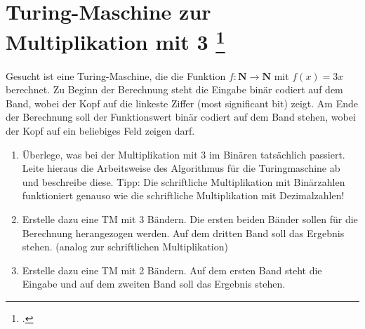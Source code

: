 \documentclass{lehramt-informatik-aufgabe}
\begin{document}
\section{Turing-Maschine zur Multiplikation mit 3
\footcite[Aufgabe 5]{theo:ab:3}}

Gesucht ist eine Turing-Maschine, die die Funktion $f : \mathbf{N}
\rightarrow \mathbf{N}$ mit $f(x) = 3x$ berechnet. Zu Beginn der
Berechnung steht die Eingabe binär codiert auf dem Band, wobei der Kopf
auf die linkeste Ziffer (most significant bit) zeigt. Am Ende der
Berechnung soll der Funktionswert binär codiert auf dem Band stehen,
wobei der Kopf auf ein beliebiges Feld zeigen darf.

\begin{enumerate}


\item Überlege, was bei der Multiplikation mit 3 im Binären tatsächlich
passiert. Leite hieraus die Arbeitsweise des Algorithmus für die
Turingmaschine ab und beschreibe diese. Tipp: Die schriftliche
Multiplikation mit Binärzahlen funktioniert genauso wie die schriftliche
Multiplikation mit Dezimalzahlen!


\item Erstelle dazu eine TM mit 3 Bändern. Die ersten beiden Bänder
sollen für die Berechnung herangezogen werden. Auf dem dritten Band soll
das Ergebnis stehen. (analog zur schriftlichen Multiplikation)


\item Erstelle dazu eine TM mit 2 Bändern. Auf dem ersten Band steht die
Eingabe und auf dem zweiten Band soll das Ergebnis stehen.
\end{enumerate}
\end{document}
